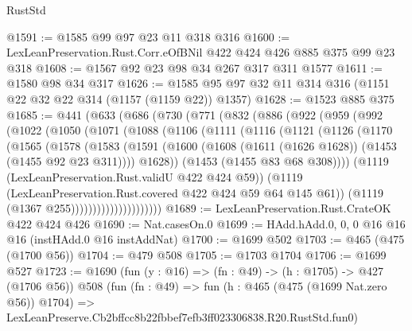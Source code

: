 \begin{lexlean}{RustStd}
\begin{coremodule}
@1591 := @1585 @99 @97 @23 @11 @318 @316
@1600 := LexLeanPreservation.Rust.Corr.eOfBNil @422 @424 @426 @885 @375 @99 @23 @318
@1608 := @1567 @92 @23 @98 @34 @267 @317 @311 @1577
@1611 := @1580 @98 @34 @317
@1626 := @1585 @95 @97 @32 @11 @314 @316 (@1151 @22 @32 @22 @314 (@1157 (@1159 @22)) @1357)
@1628 := @1523 @885 @375
@1685 := @441
    (@633
      (@686
        (@730
          (@771
            (@832
              (@886
                (@922
                  (@959
                    (@992
                      (@1022
                        (@1050
                          (@1071
                            (@1088
                              (@1106
                                (@1111
                                  (@1116
                                    (@1121
                                      (@1126
                                        (@1170
                                          (@1565
                                            (@1578
                                              (@1583
                                                (@1591
                                                  (@1600
                                                    (@1608
                                                      (@1611 (@1626 @1628))
                                                      (@1453 (@1455 @92 @23 @311))))
                                                  @1628))
                                              (@1453 (@1455 @83 @68 @308))))
                                          (@1119 (LexLeanPreservation.Rust.validU @422 @424 @59))
                                          (@1119
                                            (LexLeanPreservation.Rust.covered
                                              @422
                                              @424
                                              @59
                                              @64
                                              @145
                                              @61))
                                          (@1119 (@1367 @255)))))))))))))))))))))
@1689 := LexLeanPreservation.Rust.CrateOK @422 @424 @426
@1690 := Nat.casesOn.{0}
@1699 := HAdd.hAdd.{0, 0, 0} @16 @16 @16 (instHAdd.{0} @16 instAddNat)
@1700 := @1699 @502
@1703 := @465 (@475 (@1700 @56))
@1704 := @479 @508
@1705 := @1703 @1704
@1706 := @1699 @527
@1723 := @1690
    (fun (y : @16) => (fn : @49) -> (h : @1705) -> @427 (@1706 @56))
    @508
    (fun (fn : @49) =>
    fun (h : @465 (@475 (@1699 Nat.zero @56)) @1704) =>
    LexLeanPreserve.Cb2bffcc8b22fbbef7efb3ff023306838.R20.RustStd.fun0)

\end{coremodule}
\end{lexlean}

